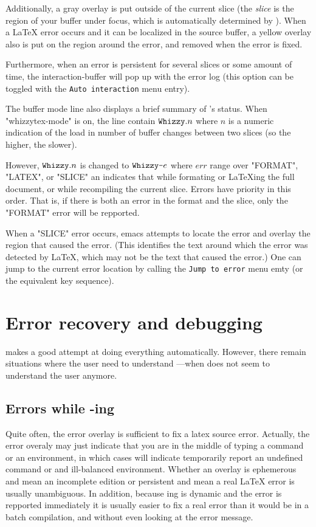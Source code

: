 \documentclass[12pt]{article}
\begin{document}
Additionally, a gray overlay is put outside of the current slice (the {\em
slice} is the region of your buffer under focus, which is automatically
determined by {\whizzy}). When a {\LaTeX} error occurs and it can be
localized in the source buffer, a yellow overlay also is put on the region
around the error, and removed when the error is fixed.

Furthermore, when an error is persistent for several slices or some amount
of time, the interaction-buffer will pop up with the error log
(this option can be toggled with the {\tt Auto interaction} menu entry).  

The buffer mode line also displays a brief summary of
{\whizzy}'s status.  When \lst"whizzytex-mode" is on, the line contain
$\lst"Whizzy".n$ where $n$ is a numeric indication of the load in number
of buffer changes between two slices (so the higher, the slower). 

However, $\lst"Whizzy".n$ is changed to $\lst"Whizzy-"e$ where $err$ range
over \lst"FORMAT", \lst"LATEX", or \lst"SLICE" an indicates that while
formating or \LaTeX ing the full document, or while recompiling the current
slice. Errors have priority in this order.  That is, if there is both an
error in the format and the slice, only the \lst"FORMAT" error will be
repported.

When a \lst"SLICE" error occurs, emacs attempts to locate the error
and overlay the region that caused the error. (This identifies the 
text around which  the error was detected by \LaTeX, which may not be the 
text that caused the error.) One can jump to the current error location by
calling the \texttt {Jump to error} menu emty (or the equivalent key
sequence). 


\section{Error recovery and debugging}

{\whizzy} makes a good attempt at doing everything automatically. 
However, there remain situations where the user need to understand 
{\whizzy} ---when {\whizzy} does not seem to understand the user anymore. 

\subsection {Errors while \whizzy-ing}

Quite often, the error overlay is sufficient to fix a latex source error. 
Actually, the error overaly may just indicate that you are in the middle of
typing a command or an environment, in which cases {\whizzy} will indicate
temporarily report an undefined command or and ill-balanced environment. 
Whether an overlay is ephemerous and mean an incomplete edition or 
persistent and mean a real {\LaTeX} error is usually unambiguous. 
In addition, because \whizzy ing is dynamic and the error is repported
immediately it is usually easier to fix a real error than it would be in a
batch compilation, and without even looking at the error message.
\end{document}

